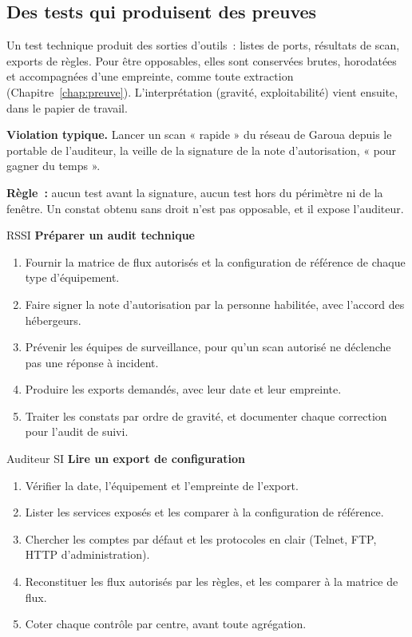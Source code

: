 \subsection{Des tests qui produisent des preuves}

Un test technique produit des sorties d'outils~: listes de ports, résultats
de scan, exports de règles. Pour être opposables, elles sont conservées
brutes, horodatées et accompagnées d'une empreinte, comme toute extraction
(Chapitre~\ref{chap:preuve}). L'interprétation (gravité, exploitabilité)
vient ensuite, dans le papier de travail.

\begin{boxalert}
\textbf{Violation typique.} Lancer un scan « rapide » du réseau de Garoua
depuis le portable de l'auditeur, la veille de la signature de la note
d'autorisation, « pour gagner du temps ».

\smallskip
\textbf{Règle~:} aucun test avant la signature, aucun test hors du
périmètre ni de la fenêtre. Un constat obtenu sans droit n'est pas
opposable, et il expose l'auditeur.
\end{boxalert}

\begin{boxmetier}{RSSI}
\textbf{Préparer un audit technique}
\begin{enumerate}
    \item Fournir la matrice de flux autorisés et la configuration de
          référence de chaque type d'équipement.
    \item Faire signer la note d'autorisation par la personne habilitée,
          avec l'accord des hébergeurs.
    \item Prévenir les équipes de surveillance, pour qu'un scan autorisé ne
          déclenche pas une réponse à incident.
    \item Produire les exports demandés, avec leur date et leur empreinte.
    \item Traiter les constats par ordre de gravité, et documenter chaque
          correction pour l'audit de suivi.
\end{enumerate}
\end{boxmetier}

\begin{boxmetier}{Auditeur SI}
\textbf{Lire un export de configuration}
\begin{enumerate}
    \item Vérifier la date, l'équipement et l'empreinte de l'export.
    \item Lister les services exposés et les comparer à la configuration de
          référence.
    \item Chercher les comptes par défaut et les protocoles en clair
          (Telnet, FTP, HTTP d'administration).
    \item Reconstituer les flux autorisés par les règles, et les comparer à
          la matrice de flux.
    \item Coter chaque contrôle par centre, avant toute agrégation.
\end{enumerate}
\end{boxmetier}

